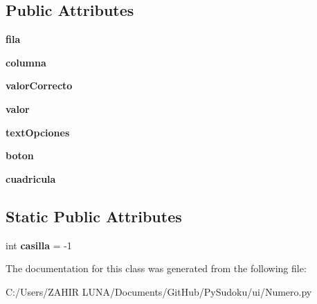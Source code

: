 \subsection*{Public Attributes}
\begin{DoxyCompactItemize}
\item 
\hypertarget{class_numero_1_1_numero_add58c510e6dfea0d3c3692c79e7c249a}{{\bfseries fila}}\label{class_numero_1_1_numero_add58c510e6dfea0d3c3692c79e7c249a}

\item 
\hypertarget{class_numero_1_1_numero_a4efc6e94fb89bf311c713fcda7fd7fac}{{\bfseries columna}}\label{class_numero_1_1_numero_a4efc6e94fb89bf311c713fcda7fd7fac}

\item 
\hypertarget{class_numero_1_1_numero_a9b4f5e3b0d3fa36ab48a1b25bc915b03}{{\bfseries valor\-Correcto}}\label{class_numero_1_1_numero_a9b4f5e3b0d3fa36ab48a1b25bc915b03}

\item 
\hypertarget{class_numero_1_1_numero_a79d57b9de0112d09194bff4aa2558fd8}{{\bfseries valor}}\label{class_numero_1_1_numero_a79d57b9de0112d09194bff4aa2558fd8}

\item 
\hypertarget{class_numero_1_1_numero_ab0d5b31bbf9e6ec1f8497bbf03ed68bf}{{\bfseries text\-Opciones}}\label{class_numero_1_1_numero_ab0d5b31bbf9e6ec1f8497bbf03ed68bf}

\item 
\hypertarget{class_numero_1_1_numero_aef53c5ef68a40f343af7a12d4fde21a0}{{\bfseries boton}}\label{class_numero_1_1_numero_aef53c5ef68a40f343af7a12d4fde21a0}

\item 
\hypertarget{class_numero_1_1_numero_a7a97cb3e4252e08aa77949a4aa616548}{{\bfseries cuadricula}}\label{class_numero_1_1_numero_a7a97cb3e4252e08aa77949a4aa616548}

\end{DoxyCompactItemize}
\subsection*{Static Public Attributes}
\begin{DoxyCompactItemize}
\item 
\hypertarget{class_numero_1_1_numero_a47b615282708c7153fce5360d06082ec}{int {\bfseries casilla} = -\/1}\label{class_numero_1_1_numero_a47b615282708c7153fce5360d06082ec}

\end{DoxyCompactItemize}


The documentation for this class was generated from the following file\-:\begin{DoxyCompactItemize}
\item 
C\-:/\-Users/\-Z\-A\-H\-I\-R  L\-U\-N\-A/\-Documents/\-Git\-Hub/\-Py\-Sudoku/ui/Numero.\-py\end{DoxyCompactItemize}
